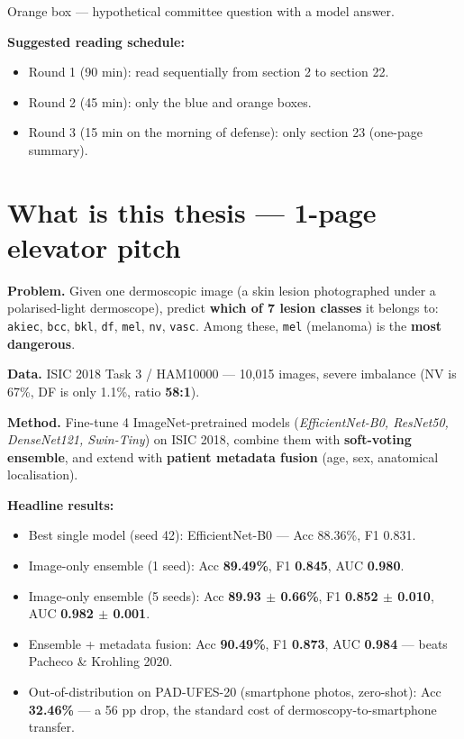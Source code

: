\documentclass[11pt,a4paper]{article}
\begin{document}
\begin{qa}
Orange box --- hypothetical committee question with a model answer.
\end{qa}

\textbf{Suggested reading schedule:}
\begin{itemize}[leftmargin=*]
  \item Round 1 (90 min): read sequentially from section 2 to section 22.
  \item Round 2 (45 min): only the blue and orange boxes.
  \item Round 3 (15 min on the morning of defense): only section 23 (one-page summary).
\end{itemize}

\section{What is this thesis --- 1-page elevator pitch}

\textbf{Problem.} Given one dermoscopic image (a skin lesion photographed under a polarised-light dermoscope), predict \textbf{which of 7 lesion classes} it belongs to: \texttt{akiec}, \texttt{bcc}, \texttt{bkl}, \texttt{df}, \texttt{mel}, \texttt{nv}, \texttt{vasc}. Among these, \texttt{mel} (melanoma) is the \textbf{most dangerous}.

\textbf{Data.} ISIC 2018 Task 3 / HAM10000 --- 10,015 images, severe imbalance (NV is 67\%, DF is only 1.1\%, ratio \textbf{58:1}).

\textbf{Method.} Fine-tune 4 ImageNet-pretrained models (\textit{EfficientNet-B0, ResNet50, DenseNet121, Swin-Tiny}) on ISIC 2018, combine them with \textbf{soft-voting ensemble}, and extend with \textbf{patient metadata fusion} (age, sex, anatomical localisation).

\textbf{Headline results:}
\begin{itemize}[leftmargin=*]
  \item Best single model (seed 42): EfficientNet-B0 --- Acc 88.36\%, F1 0.831.
  \item Image-only ensemble (1 seed): Acc \textbf{89.49\%}, F1 \textbf{0.845}, AUC \textbf{0.980}.
  \item Image-only ensemble (5 seeds): Acc \textbf{89.93 $\pm$ 0.66\%}, F1 \textbf{0.852 $\pm$ 0.010}, AUC \textbf{0.982 $\pm$ 0.001}.
  \item Ensemble + metadata fusion: Acc \textbf{90.49\%}, F1 \textbf{0.873}, AUC \textbf{0.984} --- beats Pacheco \& Krohling 2020.
  \item Out-of-distribution on PAD-UFES-20 (smartphone photos, zero-shot): Acc \textbf{32.46\%} --- a 56 pp drop, the standard cost of dermoscopy-to-smartphone transfer.
\end{itemize}
\end{document}
